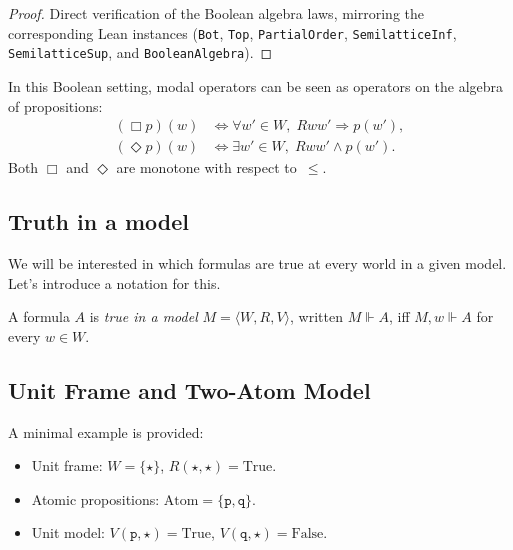 \begin{proof}
    \label{proof:boolean-structure}
  \leanok
  Direct verification of the Boolean algebra laws, mirroring the
  corresponding Lean instances (\texttt{Bot}, \texttt{Top},
  \texttt{PartialOrder}, \texttt{SemilatticeInf},
  \texttt{SemilatticeSup}, and \texttt{BooleanAlgebra}).
\end{proof}

\begin{remark}
  In this Boolean setting, modal operators can be seen as operators on
  the algebra of propositions:
  \begin{align*}
    (\Box p)(w) &\iff \forall w' \in W,\; Rww' \Rightarrow p(w'), \\
    (\Diamond p)(w) &\iff \exists w' \in W,\; Rww' \wedge p(w').
  \end{align*}
  Both $\Box$ and $\Diamond$ are monotone with respect to~$\leq$.
\end{remark}



\subsection{Truth in a model}

We will be interested in which formulas are true at every 
world in a given model. Let’s introduce a notation for this.

\begin{definition}
  \label{true-in-model}
  \leanok
  A formula $A$ is \emph{true in a model} 
$M = \langle W, R, V \rangle$, written $M \Vdash A$, iff 
$M, w \Vdash A$ for every $w \in W$.
\end{definition}

\subsection{Unit Frame and Two-Atom Model}

A minimal example is provided:
\begin{itemize}
  \item Unit frame: $W = \{\star\}$, $R(\star,\star) = \text{True}$.
  \item Atomic propositions: $\mathrm{Atom} = \{\texttt{p}, \texttt{q}\}$.
  \item Unit model: $V(\texttt{p},\star) = \text{True}$, $V(\texttt{q},\star) = \text{False}$.
\end{itemize}

